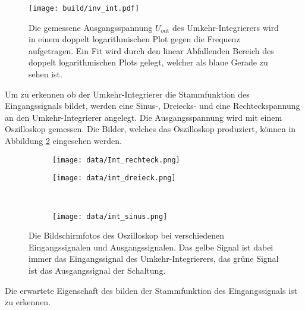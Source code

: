 \begin{figure}[H]
    \centering
    \texttt{[image: build/inv\_int.pdf]}
    \caption{Die gemessene Ausgangsspannung $U_\text{out}$ des Umkehr-Integrierers wird in einem doppelt logarithmischen Plot gegen die Frequenz aufgetragen.
    Ein Fit wird durch den linear Abfallenden Bereich des doppelt logarithmischen Plots gelegt, welcher als blaue Gerade zu sehen ist.}
    \label{fig:inv_int}
\end{figure}

Um zu erkennen ob der Umkehr-Integrierer die Stammfunktion des Eingangssignals bildet, werden eine Sinus-, Dreiecks- und eine Rechteckspannung an den Umkehr-Integrierer angelegt.
Die Ausgangsspannung wird mit einem Oszilloskop gemessen.
Die Bilder, welches das Oszilloskop produziert, können in Abbildung \ref{fig:umkehr_oszi} eingesehen werden.
\begin{figure}[H]
    \centering
    \begin{subfigure}{0.49\linewidth}%
        \texttt{[image: data/Int\_rechteck.png]}
    \end{subfigure}
    \hfill
    \begin{subfigure}{0.49\linewidth}%
        \texttt{[image: data/int\_dreieck.png]}
    \end{subfigure}\\
    \begin{subfigure}{0.49\linewidth}%
        \texttt{[image: data/int\_sinus.png]}
    \end{subfigure}
    \caption{Die Bildschirmfotos des Oszilloskop bei verschiedenen Eingangssignalen und Ausgangssignalen.
    Das gelbe Signal ist dabei immer das Eingangssignal des Umkehr-Integrierers, das grüne Signal ist das Ausgangssignal der Schaltung.}
    \label{fig:umkehr_oszi}
\end{figure}
Die erwartete Eigenschaft des bilden der Stammfunktion des Eingangssignals ist zu erkennen.
\FloatBarrier
